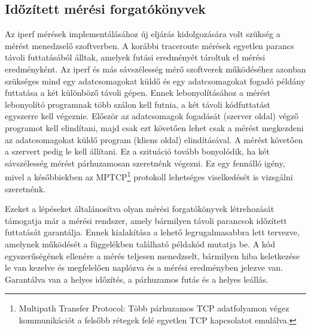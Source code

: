 \subsection{Időzített mérési forgatókönyvek}
Az iperf mérések implementálásához új eljárás kidolgozására volt szükség a mérést menedzselő szoftverben. A korábbi traceroute mérések egyetlen parancs távoli futtatásából álltak, amelyek futási eredményét tároltuk el mérési eredményként. Az iperf és más sávszélesség mérő szoftverek működéséhez azonban szükséges mind egy adatcsomagokat küldő és egy adatcsomagokat fogadó példány futtatása a két különböző távoli gépen. Ennek lebonyolításához a mérést lebonyolító programnak több szálon kell futnia, a két távoli kódfuttatást egyszerre kell végeznie. Először az adatcsomagok fogadását (szerver oldal) végző programot kell elindítani, majd csak ezt követően lehet csak a mérést megkezdeni az adatcsomagokat küldő program (kliens oldal) elindításával. A mérést követően a szervert pedig le kell állítani. Ez a szituáció tovább bonyolódik, ha két sávszélesség mérést párhuzamosan szeretnénk végezni. Ez egy fennálló igény, mivel a későbbiekben az MPTCP\footnote{Multipath Transfer Protocol: Több párhuzamos TCP adatfolyamon végez kommunikációt a felsőbb rétegek felé egyetlen TCP kapcsolatot emulálva.} protokoll lehetséges viselkedését is vizsgálni szeretnénk.

Ezeket a lépéseket általánosítva olyan mérési forgatókönyvek létrehozását támogatja már a mérési rendszer, amely bármilyen távoli parancsok időzített futtatását garantálja. Ennek kialakítása a lehető legrugalmasabbra lett tervezve, amelynek működését a függelékben található példakód mutatja be. A kód egyszerűségének ellenére a mérés teljesen menedzselt, bármilyen hiba keletkezése le van kezelve és megfelelően naplózva és a mérési eredményben jelezve van. Garantálva van a helyes időzítés, a párhuzamos futás és a helyes leállás.


